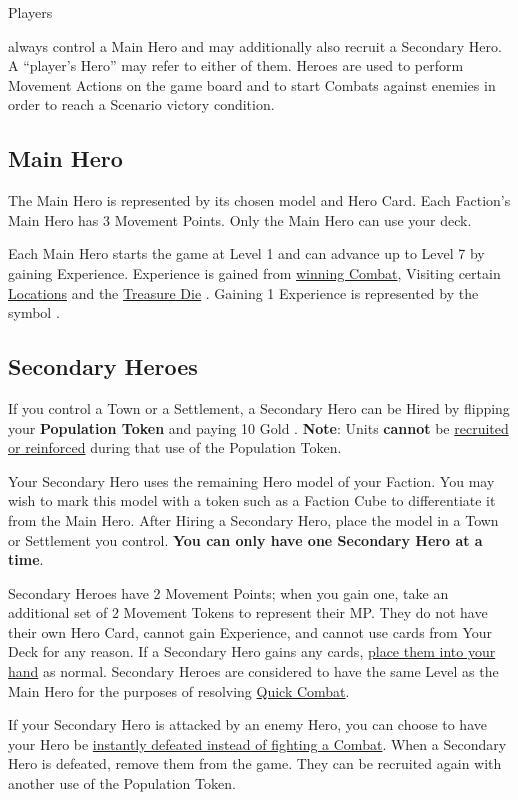
\begin{multicols*}{2}

\hypertarget{Heroes}{Players} always control a Main Hero and may additionally also recruit a Secondary Hero.
A “player's Hero” may refer to either of them.
Heroes are used to perform Movement Actions on the game board and to start Combats against enemies in order to reach a Scenario victory condition.

\subsection*{Main Hero}
The Main Hero is represented by its chosen model and Hero Card.
Each Faction's Main Hero has 3 Movement Points.
Only the Main Hero can use your deck.\par
Each Main Hero starts the game at Level 1 and can advance up to Level 7 by gaining Experience.
Experience is gained from \hyperlink{Combatexperience}{winning Combat}, Visiting certain \hyperlink{All}{Locations} and the \hyperlink{Resources}{Treasure Die} .
Gaining 1 Experience is represented by the symbol .

\subsection*{\hypertarget{Secondary}{Secondary Heroes}}
If you control a Town or a Settlement, a Secondary Hero can be Hired by flipping your \textbf{Population Token} and paying 10 Gold .
\textbf{Note}: Units \textbf{cannot} be \hyperlink{Units}{recruited or reinforced} during that use of the Population Token.\par
Your Secondary Hero uses the remaining Hero model of your Faction.
You may wish to mark this model with a token such as a Faction Cube to differentiate it from the Main Hero.
After Hiring a Secondary Hero, place the model in a Town or Settlement you control.
\textbf{You can only have one Secondary Hero at a time}.\par
Secondary Heroes have 2 Movement Points; when you gain one, take an additional set of 2 Movement Tokens to represent their MP.
They do not have their own Hero Card, cannot gain Experience, and cannot use cards from Your Deck for any reason.
If a Secondary Hero gains any cards, \hyperlink{Playerdecks}{place them into your hand} as normal.
Secondary Heroes are considered to have the same Level as the Main Hero for the purposes of resolving \hyperlink{Quick}{Quick Combat}.\par
If your Secondary Hero is attacked by an enemy Hero, you can choose to have your Hero be \hyperlink{Endcombat}{instantly defeated instead of fighting a Combat}.
When a Secondary Hero is defeated, remove them from the game.
They can be recruited again with another use of the Population Token.\par

\end{multicols*}

